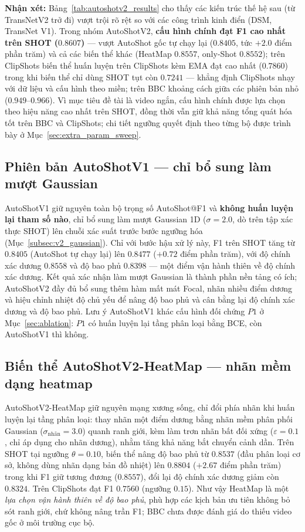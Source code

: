\textbf{Nhận xét:} Bảng~\ref{tab:autoshotv2_results} cho thấy các kiến trúc thế hệ sau (từ TransNetV2 trở đi) vượt trội rõ rệt so với các công trình kinh điển (DSM, TransNet V1). Trong nhóm AutoShotV2, \textbf{cấu hình chính đạt F1 cao nhất trên SHOT ($0.8607$)} --- vượt AutoShot gốc tự chạy lại ($0.8405$, tức $+2.0$ điểm phần trăm) và cả các biến thể khác (HeatMap $0.8557$, only-Shot $0.8552$); trên ClipShots biến thể huấn luyện trên ClipShots kèm EMA đạt cao nhất ($0.7860$) trong khi biến thể chỉ dùng SHOT tụt còn $0.7241$ --- khẳng định ClipShots nhạy với dữ liệu và cấu hình theo miền; trên BBC khoảng cách giữa các phiên bản nhỏ ($0.949$--$0.966$). Vì mục tiêu đề tài là video ngắn, cấu hình chính được lựa chọn theo hiệu năng cao nhất trên SHOT, đồng thời vẫn giữ khả năng tổng quát hóa tốt trên BBC và ClipShots; chi tiết ngưỡng quyết định theo từng bộ được trình bày ở Mục~\ref{sec:extra_param_sweep}.

\subsection{Phiên bản AutoShotV1 --- chỉ bổ sung làm mượt Gaussian}
\label{sec:autoshotv1}

AutoShotV1 giữ nguyên toàn bộ trọng số AutoShot@F1 và \textbf{không huấn luyện lại tham số nào}, chỉ bổ sung làm mượt Gaussian 1D ($\sigma = 2.0$, dò trên tập xác thực SHOT) lên chuỗi xác suất trước bước ngưỡng hóa (Mục~\ref{subsec:v2_gaussian}). Chỉ với bước hậu xử lý này, F1 trên SHOT tăng từ $0.8405$ (AutoShot tự chạy lại) lên $0.8477$ ($+0.72$ điểm phần trăm), với độ chính xác dương $0.8558$ và độ bao phủ $0.8398$ --- một điểm vận hành thiên về độ chính xác dương. Kết quả xác nhận làm mượt Gaussian là thành phần nền tảng có ích; AutoShotV2 đầy đủ bổ sung thêm hàm mất mát Focal, nhãn nhiều điểm dương và hiệu chỉnh nhiệt độ chủ yếu để nâng độ bao phủ và cân bằng lại độ chính xác dương và độ bao phủ. Lưu ý AutoShotV1 khác cấu hình đối chứng $P1$ ở Mục~\ref{sec:ablation}: $P1$ có huấn luyện lại tầng phân loại bằng BCE, còn AutoShotV1 thì không.

\subsection{Biến thể AutoShotV2-HeatMap --- nhãn mềm dạng heatmap}
\label{sec:autoshotv2_heatmap}

AutoShotV2-HeatMap giữ nguyên mạng xương sống, chỉ đổi phía nhãn khi huấn luyện lại tầng phân loại: thay nhãn một điểm dương bằng nhãn mềm phân phối Gaussian ($\sigma_{\text{nhãn}}=3.0$) quanh ranh giới, kèm làm trơn nhãn bất đối xứng ($\varepsilon=0.1$, chỉ áp dụng cho nhãn dương), nhằm tăng khả năng bắt chuyển cảnh dần. Trên SHOT tại ngưỡng $\theta=0.10$, biến thể nâng độ bao phủ từ $0.8537$ (đầu phân loại cơ sở, không dùng nhãn dạng bản đồ nhiệt) lên $0.8804$ ($+2.67$ điểm phần trăm) trong khi F1 giữ tương đương ($0.8557$), đổi lại độ chính xác dương giảm còn $0.8324$. Trên ClipShots đạt F1 $0.7560$ (ngưỡng $0.15$). Như vậy HeatMap là một \textit{lựa chọn vận hành thiên về độ bao phủ}, phù hợp các kịch bản ưu tiên không bỏ sót ranh giới, chứ không nâng trần F1; BBC chưa được đánh giá do thiếu video gốc ở môi trường cục bộ.

